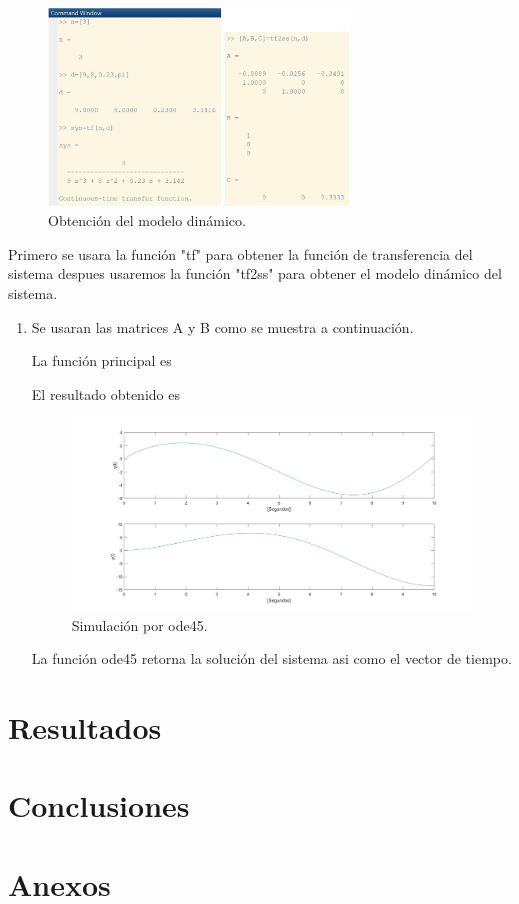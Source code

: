 \documentclass[12pt]{article}
\begin{document}
\begin{enumerate}
    \begin{figure}[h]
        \centering
        \includegraphics[width=8cm]{IMAGENES/8.jpg}
        \caption{Obtención del modelo dinámico.}
    \end{figure}
    Primero se usara la función "tf" para obtener la función de transferencia del sistema despues usaremos la función "tf2ss" para obtener el modelo dinámico del sistema.
    \begin{enumerate}
        \item Se usaran las matrices A y B como se muestra a continuación.
        
        
        
        La función principal es
        

        El resultado obtenido es
        \begin{figure}[h]
            \centering
            \includegraphics[width=15cm]{IMAGENES/9.jpg}
            \caption{Simulación por ode45.}
        \end{figure}
        
        La función ode45 retorna la solución del sistema asi como el vector de tiempo.
    \end{enumerate}
\end{enumerate}
\section{Resultados}
\section{Conclusiones}
\section{Anexos}


\end{document}
